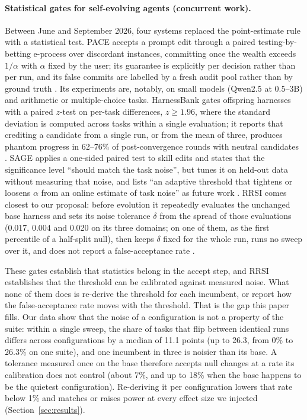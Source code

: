 \paragraph{Statistical gates for self-evolving agents (concurrent work).}
Between June and September 2026, four systems replaced the point-estimate rule
with a statistical test. PACE accepts a prompt edit through a paired
testing-by-betting e-process over discordant instances, committing once the
wealth exceeds $1/\alpha$ with $\alpha$ fixed by the user; its guarantee is
explicitly per decision rather than per run, and its false commits are labelled
by a fresh audit pool rather than by ground truth \citep{zayxshawn2026pace}.
Its experiments are, notably, on small models (Qwen2.5 at 0.5--3B) and
arithmetic or multiple-choice tasks. HarnessBank gates offspring harnesses with
a paired $z$-test on per-task differences, $z \geq 1.96$, where the standard
deviation is computed across tasks within a single evaluation; it reports that
crediting a candidate from a single run, or from the mean of three, produces phantom progress in 62--76\% of post-convergence rounds with neutral candidates \citep{luo2026harnessbank}. SAGE applies a
one-sided paired test to skill edits and states that the significance level
``should match the task noise'', but tunes it on held-out data without
measuring that noise, and lists ``an adaptive threshold that tightens or
loosens $\alpha$ from an online estimate of task noise'' as future work
\citep{wang2026sage}. RRSI comes closest to our proposal: before evolution it
repeatedly evaluates the unchanged base harness and sets its noise tolerance $\delta$ from the spread of those evaluations (0.017, 0.004 and 0.020 on its three domains; on one of them, as the first percentile of a half-split null), then keeps $\delta$ fixed for the whole run, runs no sweep over
it, and does not report a false-acceptance rate \citep{xia2026rrsi}.

These gates establish that statistics belong in the accept step, and RRSI
establishes that the threshold can be calibrated against measured noise. What
none of them does is re-derive the threshold for each incumbent, or report how
the false-acceptance rate moves with the threshold. That is the gap this paper
fills. Our data show that the noise of a configuration is not a property of the
suite: within a single sweep, the share of tasks that flip between identical
runs differs across configurations by a median of 11.1 points (up to 26.3,
from 0\% to 26.3\% on one suite), and one incumbent in three is noisier than
its base. A tolerance measured once on the base therefore accepts
null changes at a rate its calibration does not control (about 7\%, and up to
18\% when the base happens to be the quietest configuration). Re-deriving it
per configuration lowers that rate below 1\% and matches or raises power at
every effect size we injected (Section~\ref{sec:results}).

